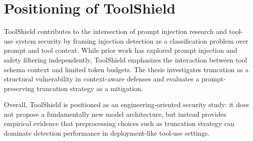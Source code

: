 \section{Positioning of ToolShield}
\label{subsec:rw_positioning}

ToolShield contributes to the intersection of prompt injection research and tool-use system security by framing injection detection as a classification problem over prompt and tool context. While prior work has explored prompt injection and safety filtering independently, ToolShield emphasizes the interaction between tool schema context and limited token budgets. The thesis investigates truncation as a structural vulnerability in context-aware defenses and evaluates a prompt-preserving truncation strategy as a mitigation.

Overall, ToolShield is positioned as an engineering-oriented security study: it does not propose a fundamentally new model architecture, but instead provides empirical evidence that preprocessing choices such as truncation strategy can dominate detection performance in deployment-like tool-use settings.
